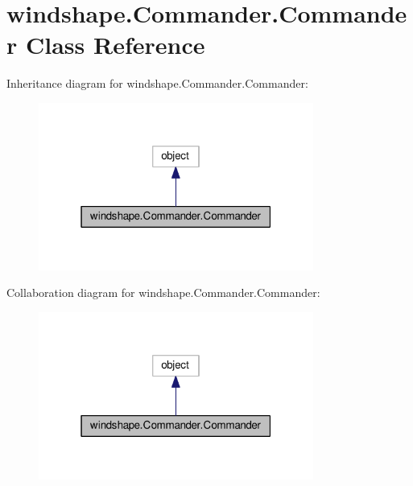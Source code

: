 \hypertarget{classwindshape_1_1_commander_1_1_commander}{}\section{windshape.\+Commander.\+Commander Class Reference}
\label{classwindshape_1_1_commander_1_1_commander}


Inheritance diagram for windshape.\+Commander.\+Commander\+:\nopagebreak
\begin{figure}[H]
\begin{center}
\leavevmode
\includegraphics[width=256pt]{classwindshape_1_1_commander_1_1_commander__inherit__graph}
\end{center}
\end{figure}


Collaboration diagram for windshape.\+Commander.\+Commander\+:\nopagebreak
\begin{figure}[H]
\begin{center}
\leavevmode
\includegraphics[width=256pt]{classwindshape_1_1_commander_1_1_commander__coll__graph}
\end{center}
\end{figure}
